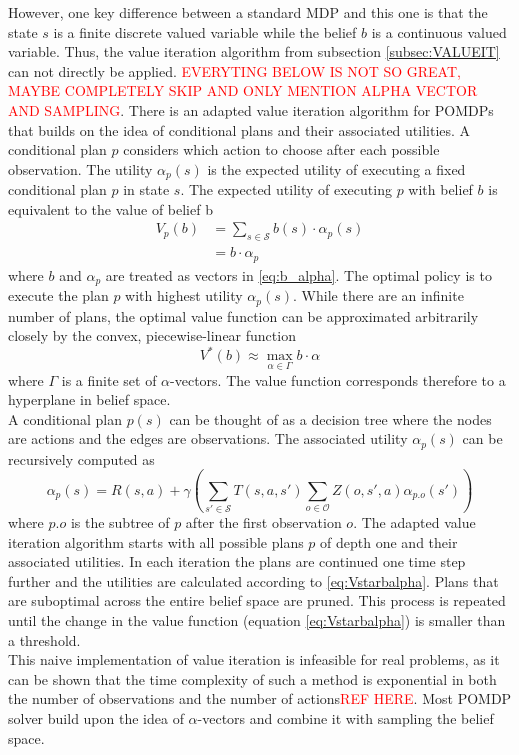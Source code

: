 However, one key difference between a standard MDP and this one is that the state $s$ is a finite discrete valued variable while the belief $b$ is a continuous valued variable. Thus, the value iteration algorithm from subsection \ref{subsec:VALUEIT} can not directly be applied. \textcolor{red}{EVERYTING BELOW IS NOT SO GREAT, MAYBE COMPLETELY SKIP AND ONLY MENTION ALPHA VECTOR AND SAMPLING}. There is an adapted value iteration algorithm for POMDPs that builds on the idea of conditional plans and their associated utilities. A conditional plan $p$ considers which action to choose after each possible observation. The utility $\alpha_p(s)$ is the expected utility of executing a fixed conditional plan $p$ in state $s$. The expected utility of executing $p$ with belief $b$ is equivalent to the value of belief b
\begin{align}
    V_p(b) &= \sum_{s\in\mathcal{S}}b(s)\cdot \alpha_p(s)\\
    &=\label{eq:b_alpha} b\cdot \alpha_p
\end{align}
where $b$ and $\alpha_p$ are treated as vectors in \ref{eq:b_alpha}. The optimal policy is to execute the plan $p$ with highest utility $\alpha_p(s)$. While there are an infinite number of plans, the optimal value function can be approximated arbitrarily closely by the convex, piecewise-linear function
\begin{equation}\label{eq:Vstarbalpha}
    V^*(b) \approx \underset{\alpha\in\Gamma}{\max }b\cdot \alpha
\end{equation}
where $\Gamma$ is a finite set of $\alpha$-vectors. The value function corresponds therefore to a hyperplane in belief space.\\
A conditional plan $p(s)$ can be thought of as a decision tree where the nodes are actions and the edges are observations. The associated utility $\alpha_p(s)$ can be recursively computed as
\begin{equation}
    \alpha_p(s) = R(s,a) + \gamma\left(\sum_{s'\in\mathcal{S}}T(s,a,s')\sum_{o\in\mathcal{O}}Z(o, s', a)\alpha_{p.o}(s')\right)
\end{equation}
where $p.o$ is the subtree of $p$ after the first observation $o$. 
The adapted value iteration algorithm starts with all possible plans $p$ of depth one and their associated utilities. In each iteration the plans are continued one time step further and the utilities are calculated according to \ref{eq:Vstarbalpha}. Plans that are suboptimal across the entire belief space are pruned. This process is repeated until the change in the value function (equation \ref{eq:Vstarbalpha}) is smaller than a threshold.\\
This naive implementation of value iteration is infeasible for real problems, as it can be shown that the time complexity of such a method is exponential in both the number of observations and the number of actions\textcolor{red}{REF HERE}. Most POMDP solver build upon the idea of $\alpha$-vectors and combine it with sampling the belief space.



